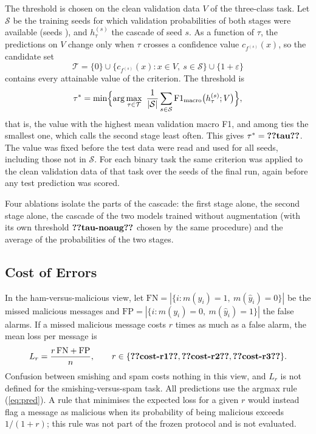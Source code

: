 The threshold is chosen on the clean validation data $V$ of the three-class task. Let $\mathcal{S}$ be the training seeds for which validation probabilities of both stages were available (seeds ), and $h^{(s)}_\tau$ the cascade of seed $s$. As a function of $\tau$, the predictions on $V$ change only when $\tau$ crosses a confidence value $c_{f^{(s)}}(x)$, so the candidate set
\begin{equation}\label{eq:cands}
\mathcal{T}=\{0\}\cup\{c_{f^{(s)}}(x):x\in V,\ s\in\mathcal{S}\}\cup\{1+\varepsilon\}
\end{equation}
contains every attainable value of the criterion. The threshold is
\begin{equation}\label{eq:tau}
\tau^{*}=\min\Bigl\{\arg\max_{\tau\in\mathcal{T}}\ \frac{1}{|\mathcal{S}|}\sum_{s\in\mathcal{S}}\mathrm{F1}_{\mathrm{macro}}\bigl(h^{(s)}_\tau;V\bigr)\Bigr\},
\end{equation}
that is, the value with the highest mean validation macro F1, and among ties the smallest one, which calls the second stage least often. This gives $\tau^{*}=\val{tau}$. The value was fixed before the test data were read and used for all  seeds, including those not in $\mathcal{S}$. For each binary task the same criterion was applied to the clean validation data of that task over the  seeds of the final run, again before any test prediction was scored.

Four ablations isolate the parts of the cascade: the first stage alone, the second stage alone, the cascade of the two models trained without augmentation (with its own threshold $\val{tau-noaug}$ chosen by the same procedure) and the average of the probabilities of the two stages.

\subsection{Cost of Errors}\label{sec:cost}

In the ham-versus-malicious view, let $\mathrm{FN}=|\{i:m(y_i)=1,\ m(\hat{y}_i)=0\}|$ be the missed malicious messages and $\mathrm{FP}=|\{i:m(y_i)=0,\ m(\hat{y}_i)=1\}|$ the false alarms. If a missed malicious message costs $r$ times as much as a false alarm, the mean loss per message is
\begin{equation}\label{eq:cost}
L_r=\frac{r\,\mathrm{FN}+\mathrm{FP}}{n},\qquad r\in\{\val{cost-r1},\val{cost-r2},\val{cost-r3}\}.
\end{equation}
Confusion between smishing and spam costs nothing in this view, and $L_r$ is not defined for the smishing-versus-spam task. All predictions use the argmax rule (\ref{eq:pred}). A rule that minimises the expected loss for a given $r$ would instead flag a message as malicious when its probability of being malicious exceeds $1/(1+r)$; this rule was not part of the frozen protocol and is not evaluated.

